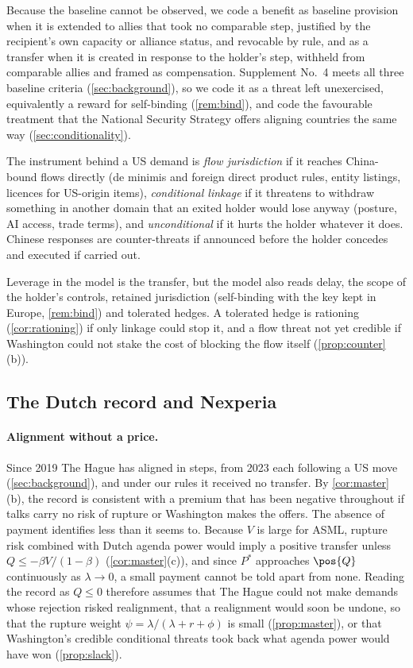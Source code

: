 Because the baseline cannot be observed, we code a benefit as baseline provision when it is extended to allies that took no comparable step, justified by the recipient's own capacity or alliance status, and revocable by rule, and as a transfer when it is created in response to the holder's step, withheld from comparable allies and framed as compensation. Supplement No.~4 meets all three baseline criteria (\cref{sec:background}), so we code it as a threat left unexercised, equivalently a reward for self-binding (\cref{rem:bind}), and code the favourable treatment that the National Security Strategy offers aligning countries the same way (\cref{sec:conditionality}).

The instrument behind a US demand is \emph{flow jurisdiction} if it reaches China-bound flows directly (de minimis and foreign direct product rules, entity listings, licences for US-origin items), \emph{conditional linkage} if it threatens to withdraw something in another domain that an exited holder would lose anyway (posture, AI access, trade terms), and \emph{unconditional} if it hurts the holder whatever it does. Chinese responses are counter-threats if announced before the holder concedes and executed if carried out.

Leverage in the model is the transfer, but the model also reads delay, the scope of the holder's controls, retained jurisdiction (self-binding with the key kept in Europe, \cref{rem:bind}) and tolerated hedges. A tolerated hedge is rationing (\cref{cor:rationing}) if only linkage could stop it, and a flow threat not yet credible if Washington could not stake the cost of blocking the flow itself (\cref{prop:counter}(b)).

\subsection{The Dutch record and Nexperia}\label{sec:record}

\paragraph{Alignment without a price.} Since 2019 The Hague has aligned in steps, from 2023 each following a US move (\cref{sec:background}), and under our rules it received no transfer. By \cref{cor:master}(b), the record is consistent with a premium that has been negative throughout if talks carry no risk of rupture or Washington makes the offers. The absence of payment identifies less than it seems to. Because $V$ is large for ASML, rupture risk combined with Dutch agenda power would imply a positive transfer unless $Q\le-\beta V/(1-\beta)$ (\cref{cor:master}(c)), and since $P^*$ approaches $\pos{Q}$ continuously as $\lambda\to 0$, a small payment cannot be told apart from none. Reading the record as $Q\le0$ therefore assumes that The Hague could not make demands whose rejection risked realignment, that a realignment would soon be undone, so that the rupture weight $\psi=\lambda/(\lambda+r+\phi)$ is small (\cref{prop:master}), or that Washington's credible conditional threats took back what agenda power would have won (\cref{prop:slack}).

